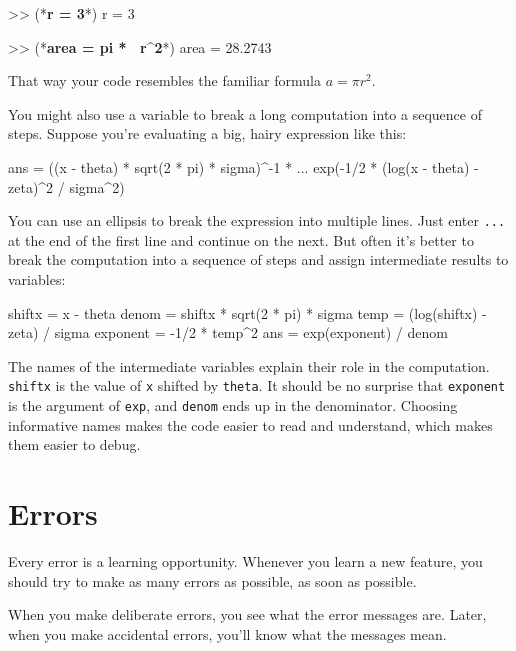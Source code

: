 \begin{code}
>> (*\textbf{r = 3}*)
r = 3

>> (*\textbf{area = pi * ~r\^{}2}*)
area = 28.2743
\end{code}

That way your code resembles the familiar formula $a = \pi r^2$.

You might also use a variable to break a long computation into a sequence of steps.
Suppose you're evaluating a big, hairy expression like this:

\begin{code}
ans = ((x - theta) * sqrt(2 * pi) * sigma)^-1 * ...
exp(-1/2 * (log(x - theta) - zeta)^2 / sigma^2)
\end{code}

You can use an ellipsis to break the expression into multiple lines.
Just enter \lstinline{...} at the end of the first line and continue on the
next.
But often it's better to break the computation into a sequence of
steps and assign intermediate results to variables:

\begin{code}
shiftx = x - theta
denom = shiftx * sqrt(2 * pi) * sigma
temp = (log(shiftx) - zeta) / sigma
exponent = -1/2 * temp^2
ans = exp(exponent) / denom
\end{code}

The names of the intermediate variables explain their role in the
computation.  \lstinline{shiftx} is the value of \lstinline{x} shifted by 
\lstinline{theta}.  It should be no surprise that \lstinline{exponent} is the argument of \lstinline{exp}, and \lstinline{denom} ends up in the denominator.  Choosing informative names makes the code easier to read and understand, which makes them easier to debug.



\section{Errors}


Every error is a learning opportunity.
Whenever you learn a new feature, you should try to make as many errors as possible, as soon as possible.

When you make deliberate errors, you see what the error messages are.
Later, when you make accidental errors, you'll know what the messages mean.

